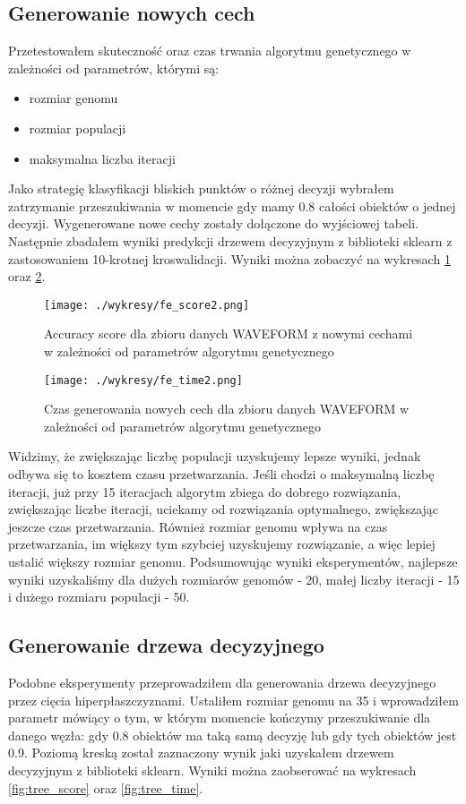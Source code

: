 \documentclass[magisterska]{pracamgr}
\theoremstyle{plain}
\theoremstyle{definition}
\theoremstyle{remark}
\begin{document}
\subsection{Generowanie nowych cech}
Przetestowałem skuteczność oraz czas trwania algorytmu genetycznego w zależności od parametrów, którymi są:
  \begin{itemize}
   \item rozmiar genomu
   \item rozmiar populacji
   \item maksymalna liczba iteracji
  \end{itemize}
Jako strategię klasyfikacji bliskich punktów o różnej decyzji wybrałem zatrzymanie przeszukiwania w momencie gdy mamy 
0.8 całości obiektów o jednej decyzji. Wygenerowane nowe cechy zostały dołączone do wyjściowej tabeli. Następnie zbadałem
wyniki predykcji drzewem decyzyjnym z biblioteki sklearn z zastosowaniem 10-krotnej kroswalidacji.
Wyniki można zobaczyć na wykresach \ref{fig:fe_score} oraz \ref{fig:fe_time}.

\begin{figure}\label{fig:fe_score}
 \caption{Accuracy score dla zbioru danych WAVEFORM z nowymi cechami w zależności od parametrów algorytmu genetycznego}
 \centering\texttt{[image: ./wykresy/fe\_score2.png]}
\end{figure}

\begin{figure}\label{fig:fe_time}
 \caption{Czas generowania nowych cech dla zbioru danych WAVEFORM w zależności od parametrów algorytmu genetycznego}
 \centering\texttt{[image: ./wykresy/fe\_time2.png]}
\end{figure}

Widzimy, że zwiększając liczbę populacji uzyskujemy lepsze wyniki, jednak odbywa się to kosztem
czasu przetwarzania. Jeśli chodzi o maksymalną liczbę iteracji, już przy 15 iteracjach algorytm zbiega do 
dobrego rozwiązania, zwiększając liczbe iteracji, uciekamy od rozwiązania optymalnego, zwiększając jeszcze 
czas przetwarzania. Również rozmiar genomu wpływa na czas przetwarzania, im większy tym szybciej
uzyskujemy rozwiązanie, a więc lepiej ustalić większy rozmiar genomu. Podsumowując wyniki eksperymentów, najlepsze
wyniki uzyskaliśmy dla dużych rozmiarów genomów - 20, małej liczby iteracji - 15 i dużego rozmiaru populacji - 50.

\subsection{Generowanie drzewa decyzyjnego}
Podobne eksperymenty przeprowadziłem dla generowania drzewa decyzyjnego przez cięcia hiperpłaszczyznami.
Ustaliłem rozmiar genomu na 35 i wprowadziłem parametr mówiący o tym, w którym momencie kończymy przeszukiwanie
dla danego węzła: gdy 0.8 obiektów ma taką samą decyzję lub gdy tych obiektów jest 0.9.
Poziomą kreską został zaznaczony wynik jaki uzyskałem drzewem decyzyjnym z biblioteki sklearn.
Wyniki można zaobserować na wykresach \ref{fig:tree_score} oraz \ref{fig:tree_time}.
\end{document}
